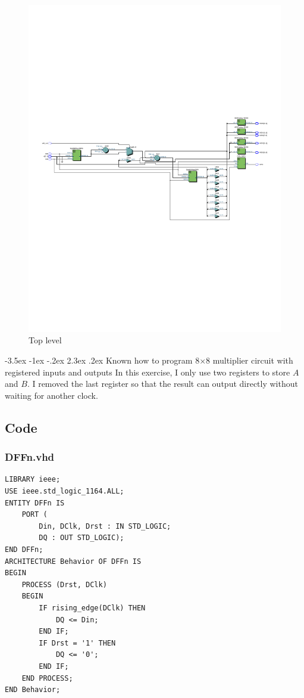 \documentclass[13pt,a4paper]{report}
\makeatletter
\renewcommand\section{\@startsection {section}{1}{-1em}%
  {-3.5ex \@plus -1ex \@minus -.2ex}%
  {2.3ex \@plus.2ex}%
  {\normalfont\Large\bfseries}}
\makeatother
\begin{document}
\begin{figure}[H]
\centering
\includegraphics[scale=0.85, clip, trim={0cm 9cm 0cm 9cm}]{images/Exc2_RTL.pdf}
\caption*{Top level}
\end{figure}

\section{Known how to program 8$\times$8 multiplier circuit with registered inputs and outputs}
In this exercise, I only use two registers to store $A$ and $B$. I removed the last register so that the result can output directly without waiting for another clock.

\subsection{Code}
\subsubsection{DFFn.vhd}
\begin{verbatim}
LIBRARY ieee;
USE ieee.std_logic_1164.ALL;
ENTITY DFFn IS
	PORT (
		Din, DClk, Drst : IN STD_LOGIC;
		DQ : OUT STD_LOGIC);
END DFFn;
ARCHITECTURE Behavior OF DFFn IS
BEGIN
	PROCESS (Drst, DClk)
	BEGIN
		IF rising_edge(DClk) THEN
			DQ <= Din;
		END IF;
		IF Drst = '1' THEN
			DQ <= '0';
		END IF;
	END PROCESS;
END Behavior;
\end{verbatim}
\end{document}
